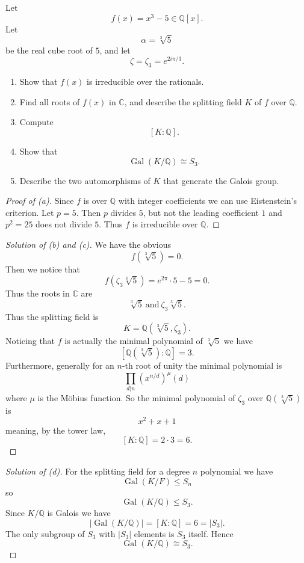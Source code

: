 \begin{prob}
    Let 
    \[
        f(x) = x^3 - 5 \in \mathbb Q[x].
    \]
    Let 
    \[
        \alpha = \sqrt[3]5
    \]
    be the real cube root of $5$, and let 
    \[
        \zeta = \zeta_3 = e^{2i\pi/3}.
    \]
    \begin{enumerate}[label=\alph*)]
        \item Show that $f(x)$ is irreducible over the 
            rationals. 
        \item Find all roots of $f(x)$ in $\mathbb C$, and 
            describe the splitting field $K$ of $f$ over 
            $\mathbb Q$.
        \item Compute 
            \[
                [K:\mathbb Q].
            \]
        \item Show that 
            \[
                \operatorname{Gal}(K/\mathbb Q) \cong S_3.
            \]
        \item Describe the two automorphisms of $K$ that generate 
            the Galois group.
    \end{enumerate}
\end{prob}
\begin{proof}[Proof of (a)]
    Since $f$ is over $\mathbb Q$ with integer coefficients we can 
    use Eistenstein's criterion. Let $p = 5$. Then 
    $p$ divides $5$, but not the leading coefficient $1$ and 
    $p^2 = 25$ does not divide $5$. Thus $f$ is irreducible over 
    $\mathbb Q$.
\end{proof}
\begin{proof}[Solution of (b) and (c)]
    We have the obvious 
    \[
        f(\sqrt[3]5) = 0.
    \]
    Then we notice that 
    \[
        f(\zeta_3\sqrt[3]5) = 
        e^{2\pi}\cdot 5 - 5 
        = 0.
    \]
    Thus the roots in $\mathbb C$ are 
    \[
        \sqrt[3]5 \ \text{and} \ \zeta_3\sqrt[3]5.
    \]
    Thus the splitting field is 
    \[
        K = \mathbb Q(\sqrt[3]5, \zeta_3).
    \]
    Noticing that $f$ is actually the minimal polynomial of 
    $\sqrt[3]5$ we have 
    \[
        [\mathbb Q(\sqrt[3]5) : \mathbb Q] = 3. 
    \]
    Furthermore, generally for an $n$-th root of unity the minimal 
    polynomial is 
    \[
        \prod_{d|n} (x^{n/d})^\mu(d)
    \]
    where $\mu$ is the Möbius function. 
    So the minimal polynomial of $\zeta_3$ over $\mathbb Q(\sqrt[3]
    5)$ is 
    \[
        x^2 + x + 1
    \]  
    meaning, by the tower law,  
    \[
        [K:\mathbb Q] 
        = 2 \cdot 3 = 6.
    \]
\end{proof}
\begin{proof}[Solution of (d)]
    For the splitting field for a degree $n$ polynomial we have 
    \[
        \operatorname{Gal}(K/F) \leq S_n
    \]
    so 
    \[
        \operatorname{Gal}(K/\mathbb Q) \leq S_3. 
    \]
    Since $K/\mathbb Q$ is Galois we have 
    \[
        |\operatorname{Gal}(K/\mathbb Q)|
        = [K:\mathbb Q] = 6 = |S_3|. 
    \]
    The only subgroup of $S_3$ with $|S_3|$ elements is $S_3$ itself.
    Hence 
    \[
        \operatorname{Gal}(K/\mathbb Q)
        \cong S_3.
    \]
\end{proof}
